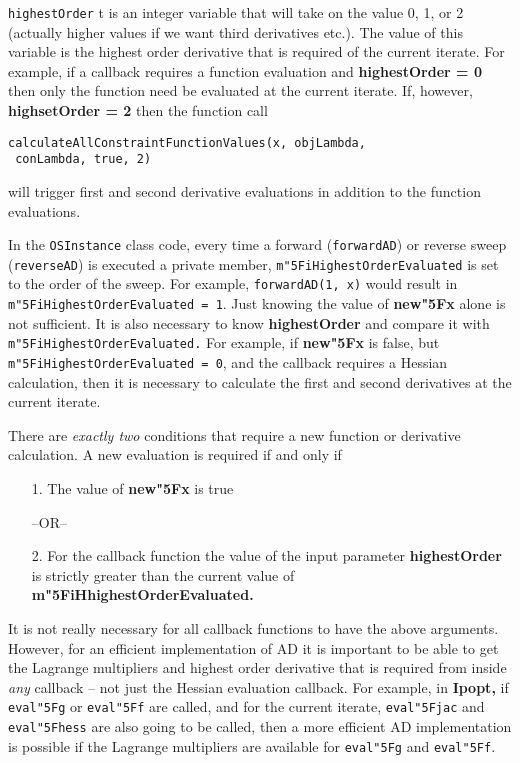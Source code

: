 \documentclass[11pt]{article}
\renewcommand{\_}{{\char"5F}}
\renewcommand{\{}{{\char"7B}}
\renewcommand{\}}{{\char"7D}}
\renewcommand{\^}{{\char"0D}}
\renewcommand{\'}{{\char"0D}}
\begin{document}
  {\tt highestOrder} t is an integer variable that will take on the value 0, 1, or 2 (actually higher values if we want third derivatives etc.).  The value of this variable is the highest order derivative that is required of the current iterate. For example, if  a callback requires a function evaluation and {\bf highestOrder = 0} then only the function need be evaluated at the current iterate.  If, however, {\bf highsetOrder = 2} then the function call
\begin{verbatim}
calculateAllConstraintFunctionValues(x, objLambda, 
 conLambda, true, 2)
\end{verbatim}  
will trigger  first and second derivative evaluations in addition to the function evaluations.

In the {\tt OSInstance} class code,  every time a forward ({\tt forwardAD}) or reverse sweep ({\tt reverseAD}) is executed a private  member, {\tt m\_iHighestOrderEvaluated}  is  set to the order of the sweep. For example, {\tt forwardAD(1, x)} would result in {\tt  m\_iHighestOrderEvaluated = 1}.  Just knowing the value  of {\bf new\_x} alone is not sufficient. It is also necessary  to know {\bf highestOrder} and compare it with {\tt m\_iHighestOrderEvaluated.}  For example, if  {\bf new\_x}  is  false,  but {\tt m\_iHighestOrderEvaluated = 0},  and   the callback requires a Hessian calculation, then it is necessary to calculate the first and second derivatives at the current iterate. 

There are {\it  exactly two} conditions that  require a new function or derivative calculation.   A new evaluation is required if and only if

\begin{itemize}
\item[1.]   The value of {\bf new\_x} is  true

\begin{center}
 --OR--
\end{center}


\item[2.] For the callback function the value of the input parameter {\bf highestOrder} is strictly greater than the current value  of    {\bf m\_iHhighestOrderEvaluated.} 
\end{itemize}

It is not really necessary for all callback functions to have the above arguments. However, for an efficient implementation of AD it is important to be able to get the Lagrange multipliers and highest order derivative that is required from inside {\it any} callback -- not just the Hessian evaluation callback. For example, in {\bf Ipopt,} if  {\tt eval\_g}  or {\tt eval\_f} are called, and  for the current iterate, {\tt eval\_jac} and {\tt eval\_hess} are also going to be called, then  a more efficient AD implementation is possible if the Lagrange multipliers are available for {\tt eval\_g} and {\tt eval\_f}. 
\end{document}
